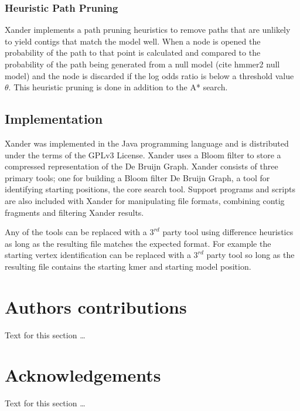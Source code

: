 \documentclass[10pt]{bmc_article}
\newenvironment{bmcformat}{\begin{raggedright}\baselineskip20pt\sloppy\setboolean{publ}{false}}{\end{raggedright}\baselineskip20pt\sloppy}
\begin{document}
\begin{bmcformat}
\subsubsection*{Heuristic Path Pruning}
Xander implements a path pruning heuristics to remove paths that are unlikely to yield contigs that match the model well.  When a node is opened the probability of the path to that point is calculated and compared to the probability of the path being generated from a null model (cite hmmer2 null model) and the node is discarded if the log odds ratio is below a threshold value $\theta$. This heuristic pruning is done in addition to the A* search.  

\subsection*{Implementation}
Xander was implemented in the Java programming language and is distributed under the terms of the GPLv3 License.  Xander uses a Bloom filter to store a compressed representation of the De Bruijn Graph. Xander consists of three primary tools; one for building a Bloom filter De Bruijn Graph, a tool for identifying starting positions, the core search tool. Support programs and scripts are also included with Xander for manipulating file formats, combining contig fragments and filtering Xander results.

Any of the tools can be replaced with a $3^{rd}$ party tool using difference heuristics as long as the resulting file matches the expected format.  For example the starting vertex identification can be replaced with a $3^{rd}$ party tool so long as the resulting file contains the starting kmer and starting model position.
    
\section*{Authors contributions}
    Text for this section \ldots

    

\section*{Acknowledgements}
  Text for this section \ldots



\end{bmcformat}
\end{document}
